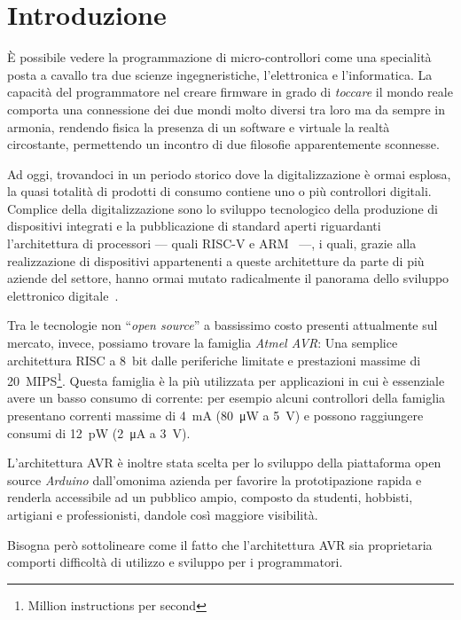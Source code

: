 \chapter{Introduzione}

È possibile vedere la programmazione di micro-controllori come una specialità posta a cavallo tra due scienze ingegneristiche, l'elettronica e l'informatica.
La capacità del programmatore nel creare firmware in grado di \textit{toccare} il mondo reale comporta una connessione dei due mondi molto diversi tra loro ma da sempre in armonia, rendendo fisica la presenza di un software e virtuale la realtà circostante, permettendo un incontro di due filosofie apparentemente sconnesse.

Ad oggi, trovandoci in un periodo storico dove la digitalizzazione è ormai esplosa, la quasi totalità di prodotti di consumo contiene uno o più controllori digitali.
Complice della digitalizzazione sono lo sviluppo tecnologico della produzione di dispositivi integrati e la pubblicazione di standard aperti riguardanti l'architettura di processori --- quali RISC-V e ARM~\cite{site:arm-licensing} ---, i quali, grazie alla realizzazione di dispositivi appartenenti a queste architetture da parte di più aziende del settore, hanno ormai mutato radicalmente il panorama dello sviluppo elettronico digitale~\cite{arm-intel-phone-market}\cite{site:arm-press-200b-chips}.

Tra le tecnologie non ``\textit{open source}'' a bassissimo costo presenti attualmente sul mercato, invece, possiamo trovare la famiglia \textit{Atmel AVR}: Una semplice architettura RISC a 8~bit dalle periferiche limitate e prestazioni massime di \SI{20}{MIPS}\footnote{Million instructions per second}.
Questa famiglia è la più utilizzata per applicazioni in cui è essenziale avere un basso consumo di corrente: per esempio alcuni controllori della famiglia presentano correnti massime di \SI{4}{\milli\ampere} (\SI{80}{\micro\watt} a \SI{5}{\volt}) e possono raggiungere consumi di \SI{12}{\pico\watt} (\SI{2}{\micro\ampere} a \SI{3}{\volt})\cite{avr:tiny4}.

L'architettura AVR è inoltre stata scelta per lo sviluppo della piattaforma open source \textit{Arduino} dall'omonima azienda per favorire la prototipazione rapida e renderla accessibile ad un pubblico ampio, composto da studenti, hobbisti, artigiani e professionisti\cite{site:arduino-about}, dandole così maggiore visibilità.

Bisogna però sottolineare come il fatto che l'architettura AVR sia proprietaria comporti difficoltà di utilizzo e sviluppo per i programmatori.

